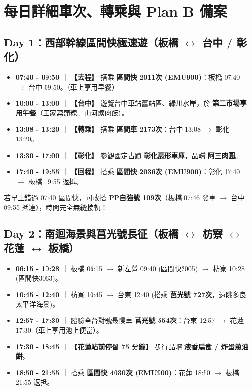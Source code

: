 \documentclass[11pt, a4paper]{article}
\begin{document}
\section{每日詳細車次、轉乘與 Plan B 備案}

\subsection{Day 1：西部幹線區間快極速遊（板橋 $\leftrightarrow$ 台中 / 彰化）}
\begin{itemize}
    \item \textbf{07:40 - 09:50} ｜ \textbf{【去程】} 搭乘 \textbf{區間快 2011次 (EMU900)}：板橋 07:40 $\to$ 台中 09:50。（車上享用早餐）
    \item \textbf{10:00 - 13:00} ｜ \textbf{【台中】} 遊覽台中車站舊站區、綠川水岸，於 \textbf{第二市場享用午餐}（王家菜頭粿、山河爌肉飯）。
    \item \textbf{13:08 - 13:20} ｜ \textbf{【轉乘】} 搭乘 \textbf{區間車 2173次}：台中 13:08 $\to$ 彰化 13:20。
    \item \textbf{13:30 - 17:00} ｜ \textbf{【彰化】} 參觀國定古蹟 \textbf{彰化扇形車庫}，品嚐 \textbf{阿三肉圓}。
    \item \textbf{17:40 - 19:55} ｜ \textbf{【回程】} 搭乘 \textbf{區間快 2036次 (EMU900)}：彰化 17:40 $\to$ 板橋 19:55 返抵。
\end{itemize}
\begin{tcolorbox}[colback=yellow!10!white,colframe=orange,title=\textbf{Day 1 應變備案 (Plan B)}]
若早上錯過 07:40 區間快，可改搭 \textbf{PP自強號 109次}（板橋 07:46 發車 $\to$ 台中 09:55 抵達），時間完全無縫接軌！
\end{tcolorbox}

\subsection{Day 2：南迴海景與莒光號長征（板橋 $\leftrightarrow$ 枋寮 $\leftrightarrow$ 花蓮 $\leftrightarrow$ 板橋）}
\begin{itemize}
    \item \textbf{06:15 - 10:28} ｜ 板橋 06:15 $\to$ 新左營 09:40 (區間快2005) $\to$ 枋寮 10:28 (區間快3063)。
    \item \textbf{10:45 - 12:40} ｜ 枋寮 10:45 $\to$ 台東 12:40 (搭乘 \textbf{莒光號 727次}，遠眺多良太平洋海景)。
    \item \textbf{12:57 - 17:30} ｜ 體驗全台對號最慢車 \textbf{莒光號 554次}：台東 12:57 $\to$ 花蓮 17:30（車上享用池上便當）。
    \item \textbf{17:30 - 18:45} ｜ \textbf{【花蓮站前停留 75 分鐘】} 步行品嚐 \textbf{液香扁食 / 炸蛋蔥油餅}。
    \item \textbf{18:50 - 21:55} ｜ 搭乘 \textbf{區間快 4030次 (EMU900)}：花蓮 18:50 $\to$ 板橋 21:55 返抵。
\end{itemize}
\end{document}
